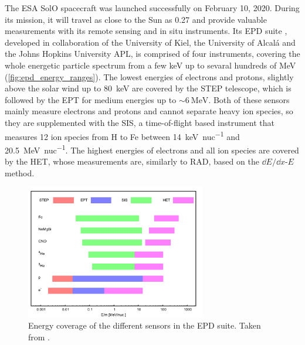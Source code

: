 The ESA \acl{SolO} spacecraft \citep[\acs{SolO}][]{Mueller-2020-SolO} was launched successfully on February 10, 2020. During its mission, it will travel as close to the Sun as \SI{0.27}{\AU} and provide valuable measurements with its remote sensing and in situ instruments. Its \ac{EPD} suite \citep[\acs{EPD},][]{RodriguezPacheco-2019-EPD}, developed in collaboration of the University of Kiel, the University of Alcalá and the Johns Hopkins University APL, is comprised of four instruments, covering the whole energetic particle spectrum from a few \si{\kilo\electronvolt} up to sevaral hundreds of \si{\mega\electronvolt} (\autoref{fig:epd_energy_ranges}). The lowest energies of electrons and protons, slightly above the solar wind up to \SI{80}{\kilo\electronvolt} are covered by the \ac{STEP} telescope, which is followed by the \ac{EPT} for medium energies up to $\sim\SI{6}{\mega\electronvolt}$. Both of these sensors mainly measure electrons and protons and cannot separate heavy ion species, so they are supplemented with the \ac{SIS}, a time-of-flight based instrument that measures 12 ion species from H to Fe between \SI{14}{\kilo\electronvolt\per nuc} and \SI{20.5}{\mega\electronvolt\per nuc}. The highest energies of electrons and all ion species are covered by the \ac{HET}, whose measurements are, similarly to \ac{RAD}, based on the $\dd E/\dd x$-$E$ method.


\begin{figure}
	\centering
	\includegraphics[width=0.7\textwidth]{images/epd-energy-ranges.pdf}
	\caption[\acs{EPD} energy coverage]{Energy coverage of the different sensors in the \ac{EPD} suite. Taken from \citet[Fig. 3]{RodriguezPacheco-2019-EPD}.}
	\label{fig:epd_energy_ranges}
\end{figure}

